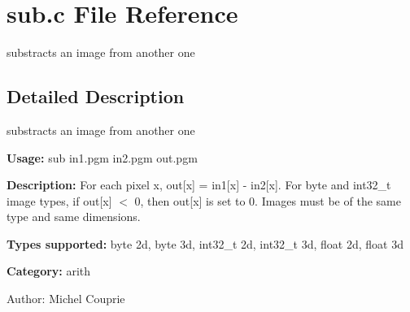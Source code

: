 \section{sub.c File Reference}
\label{sub_8c}
substracts an image from another one 



\subsection{Detailed Description}
substracts an image from another one 

{\bf Usage:} sub in1.pgm in2.pgm out.pgm

{\bf Description:} For each pixel x, out[x] = in1[x] - in2[x]. For byte and int32\_\-t image types, if out[x] $<$ 0, then out[x] is set to 0. Images must be of the same type and same dimensions.

{\bf Types supported:} byte 2d, byte 3d, int32\_\-t 2d, int32\_\-t 3d, float 2d, float 3d

{\bf Category:} arith

\begin{Desc}
\item[Author:]Michel Couprie \end{Desc}
